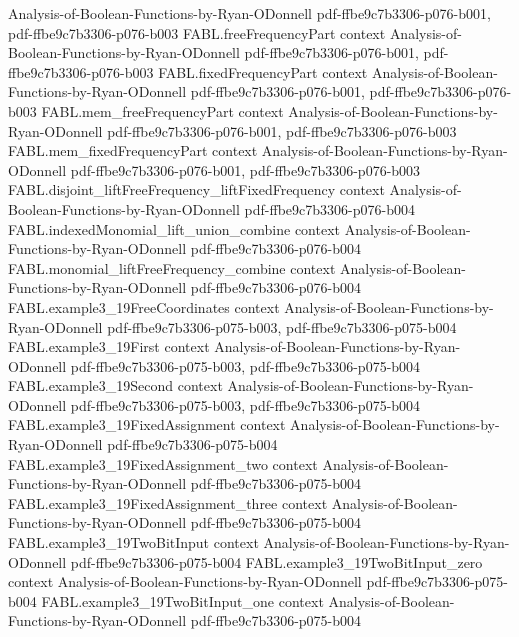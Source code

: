 \begin{theorem}
  {Analysis-of-Boolean-Functions-by-Ryan-ODonnell}
  {pdf-ffbe9c7b3306-p076-b001,
    pdf-ffbe9c7b3306-p076-b003}
\proofstep
  {FABL.freeFrequencyPart}
  {context}
  {Analysis-of-Boolean-Functions-by-Ryan-ODonnell}
  {pdf-ffbe9c7b3306-p076-b001,
    pdf-ffbe9c7b3306-p076-b003}
\proofstep
  {FABL.fixedFrequencyPart}
  {context}
  {Analysis-of-Boolean-Functions-by-Ryan-ODonnell}
  {pdf-ffbe9c7b3306-p076-b001,
    pdf-ffbe9c7b3306-p076-b003}
\proofstep
  {FABL.mem_freeFrequencyPart}
  {context}
  {Analysis-of-Boolean-Functions-by-Ryan-ODonnell}
  {pdf-ffbe9c7b3306-p076-b001,
    pdf-ffbe9c7b3306-p076-b003}
\proofstep
  {FABL.mem_fixedFrequencyPart}
  {context}
  {Analysis-of-Boolean-Functions-by-Ryan-ODonnell}
  {pdf-ffbe9c7b3306-p076-b001,
    pdf-ffbe9c7b3306-p076-b003}
\proofstep
  {FABL.disjoint_liftFreeFrequency_liftFixedFrequency}
  {context}
  {Analysis-of-Boolean-Functions-by-Ryan-ODonnell}
  {pdf-ffbe9c7b3306-p076-b004}
\proofstep
  {FABL.indexedMonomial_lift_union_combine}
  {context}
  {Analysis-of-Boolean-Functions-by-Ryan-ODonnell}
  {pdf-ffbe9c7b3306-p076-b004}
\proofstep
  {FABL.monomial_liftFreeFrequency_combine}
  {context}
  {Analysis-of-Boolean-Functions-by-Ryan-ODonnell}
  {pdf-ffbe9c7b3306-p076-b004}
\proofstep
  {FABL.example3_19FreeCoordinates}
  {context}
  {Analysis-of-Boolean-Functions-by-Ryan-ODonnell}
  {pdf-ffbe9c7b3306-p075-b003,
    pdf-ffbe9c7b3306-p075-b004}
\proofstep
  {FABL.example3_19First}
  {context}
  {Analysis-of-Boolean-Functions-by-Ryan-ODonnell}
  {pdf-ffbe9c7b3306-p075-b003,
    pdf-ffbe9c7b3306-p075-b004}
\proofstep
  {FABL.example3_19Second}
  {context}
  {Analysis-of-Boolean-Functions-by-Ryan-ODonnell}
  {pdf-ffbe9c7b3306-p075-b003,
    pdf-ffbe9c7b3306-p075-b004}
\proofstep
  {FABL.example3_19FixedAssignment}
  {context}
  {Analysis-of-Boolean-Functions-by-Ryan-ODonnell}
  {pdf-ffbe9c7b3306-p075-b004}
\proofstep
  {FABL.example3_19FixedAssignment_two}
  {context}
  {Analysis-of-Boolean-Functions-by-Ryan-ODonnell}
  {pdf-ffbe9c7b3306-p075-b004}
\proofstep
  {FABL.example3_19FixedAssignment_three}
  {context}
  {Analysis-of-Boolean-Functions-by-Ryan-ODonnell}
  {pdf-ffbe9c7b3306-p075-b004}
\proofstep
  {FABL.example3_19TwoBitInput}
  {context}
  {Analysis-of-Boolean-Functions-by-Ryan-ODonnell}
  {pdf-ffbe9c7b3306-p075-b004}
\proofstep
  {FABL.example3_19TwoBitInput_zero}
  {context}
  {Analysis-of-Boolean-Functions-by-Ryan-ODonnell}
  {pdf-ffbe9c7b3306-p075-b004}
\proofstep
  {FABL.example3_19TwoBitInput_one}
  {context}
  {Analysis-of-Boolean-Functions-by-Ryan-ODonnell}
  {pdf-ffbe9c7b3306-p075-b004}
\proofstep

\end{theorem}

